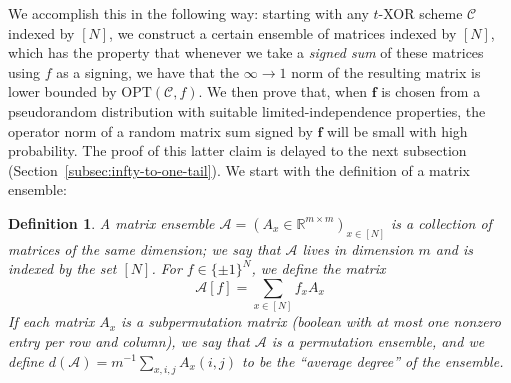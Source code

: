 \documentclass[11pt]{article}
\newtheorem{definition}{Definition}
\newcommand{\Opt}{\mathrm{OPT}}
\newcommand{\N}{[N]}
\begin{document}
We accomplish this in the following way: starting with any $t$-XOR scheme $\mathcal{C}$ indexed by $\N$, we construct a certain ensemble of matrices indexed by $\N$, which has the property that whenever we take a \emph{signed sum} of these matrices using $f$ as a signing, we have that the $\infty\to1$ norm of the resulting matrix is lower bounded by $\Opt(\mathcal{C},f)$. We then prove that, when $\bm{f}$ is chosen from a pseudorandom distribution with suitable limited-independence properties, the operator norm of a random matrix sum signed by $\bm{f}$ will be small with high probability. The proof of this latter claim is delayed to the next subsection (Section~\ref{subsec:infty-to-one-tail}).
We start with the definition of a matrix ensemble: 
\begin{definition}
A matrix ensemble $\mathcal{A} = (A_x\in \mathbb{R}^{m \times m})_{x \in \N}$ is a collection of matrices of the same dimension; we say that $\mathcal{A}$ lives in dimension $m$ and is indexed by the set $\N$. For $f\in \{\pm 1\}^N$, we define the matrix
\[
\mathcal{A}[f] = \sum_{x\in \N} f_x A_x
\]
If each matrix $A_x$ is a subpermutation matrix (boolean with at most one nonzero entry per row and column), we say that $\mathcal{A}$ is a permutation ensemble, and we define $d(\mathcal{A})= m^{-1} \sum_{x,i,j}A_x(i,j)$ to be the ``average degree'' of the ensemble.
\end{definition}
\end{document}
